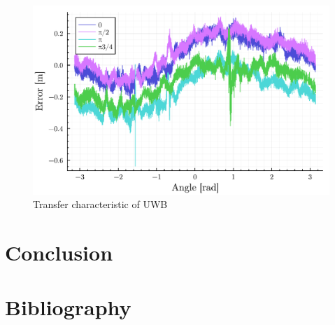 \documentclass[twoside]{ctustyle/ctuthesis}
\theoremstyle{plain}
\theoremstyle{definition}
\theoremstyle{note}
\begin{document}
\begin{figure}

{\centering \includegraphics{chapters/6_experiments_files/figure-pdf/fig-angle-output-1.pdf}

}

\caption{\label{fig-angle}Transfer characteristic of UWB}

\end{figure}


\hypertarget{conclusion}{%
\chapter{Conclusion}\label{conclusion}}


\hypertarget{bibliography}{%
\chapter*{Bibliography}\label{bibliography}}


\appendix
\end{document}
